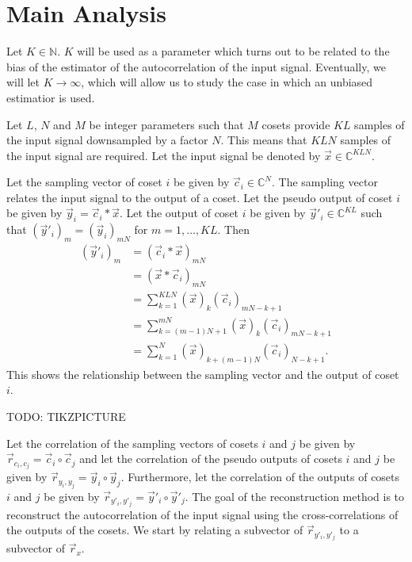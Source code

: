 \documentclass[a4paper, openany, oneside]{memoir}
\begin{document}
\section{Main Analysis}
Let $K \in \mathbb{N}$. $K$ will be used as a parameter which turns out to be related to the bias of the estimator of the autocorrelation of the input signal. Eventually, we will let $K \to \infty$, which will allow us to study the case in which an unbiased estimatior is used.

Let $L$, $N$ and $M$ be integer parameters such that $M$ cosets provide $KL$ samples of the input signal downsampled by a factor $N$. This means that $KLN$ samples of the input signal are required. Let the input signal be denoted by $\vec{x} \in \mathbb{C}^{KLN}$.

Let the sampling vector of coset $i$ be given by $\vec{c}_i \in \mathbb{C}^{N}$. The sampling vector relates the input signal to the output of a coset. Let the pseudo output of coset $i$ be given by $\vec{y}_i = \vec{c}_i \ast \vec{x}$. Let the output of coset $i$ be given by $\vec{y}'_i \in \mathbb{C}^{KL}$ such that $(\vec{y}'_i)_m=(\vec{y}_i)_{mN}$ for $m=1,\ldots,KL$. Then
\begin{align*}
    (\vec{y}'_i)_m &= (\vec{c}_i \ast \vec{x})_{mN} \\
    &= (\vec{x} \ast \vec{c}_i)_{mN} \\
    &= \sum_{k=1}^{KLN} (\vec{x})_k (\vec{c}_i)_{mN-k+1} \\
    &= \sum_{k=(m-1)N+1}^{mN} (\vec{x})_k (\vec{c}_i)_{mN-k+1} \\
    &= \sum_{k=1}^{N} (\vec{x})_{k+(m-1)N} (\vec{c}_i)_{N-k+1}.
\end{align*}
This shows the relationship between the sampling vector and the output of coset $i$.

TODO: TIKZPICTURE

Let the correlation of the sampling vectors of cosets $i$ and $j$ be given by $\vec{r}_{c_i,c_j} = \vec{c}_i \circ \vec{c}_j$ and let the correlation of the pseudo outputs of cosets $i$ and $j$ be given by $\vec{r}_{y_i,y_j} = \vec{y}_i \circ \vec{y}_j$. Furthermore, let the correlation of the outputs of cosets $i$ and $j$ be given by $\vec{r}_{y'_i,y'_j} = \vec{y}'_i \circ \vec{y}'_j$. The goal of the reconstruction method is to reconstruct the autocorrelation of the input signal using the cross-correlations of the outputs of the cosets. We start by relating a subvector of $\vec{r}_{y'_i,y'_j}$ to a subvector of $\vec{r}_x$.
\end{document}
